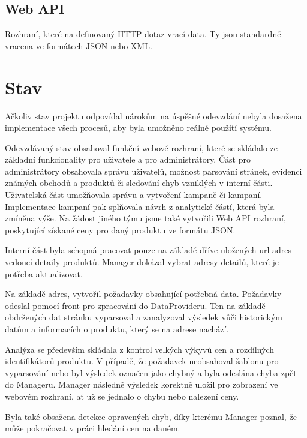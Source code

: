 \documentclass[thesis=B,czech]{FITthesis}[2012/06/26]
\begin{document}
\subsection{Web API}
Rozhraní, které na definovaný HTTP dotaz vrací data. Ty jsou standardně vracena ve formátech JSON nebo XML.

\section{Stav}
Ačkoliv stav projektu odpovídal nárokům na úspěšné odevzdání nebyla dosažena implementace všech procesů, aby byla umožněno reálné
použití systému.
\par
Odevzdávaný stav obsahoval funkční webové rozhraní, které se skládalo ze základní funkcionality pro uživatele a pro administrátory.
Část pro administrátory obsahovala správu uživatelů, možnost parsování stránek, evidenci známých obchodů a produktů či sledování
chyb vzniklých v interní části.
Uživatelská část umožňovala správu a vytvoření kampaně či kampaní. Implementace kampaní pak splňovala návrh z analytické částí,
která byla zmíněna výše.
Na žádost jiného týmu jsme také vytvořili Web API rozhraní, poskytující získané ceny pro daný produktu ve formátu JSON.
\par
Interní část byla schopná pracovat pouze na základě dříve uložených url adres vedoucí detaily produktů. 
Manager dokázal vybrat adresy detailů, které je potřeba aktualizovat.
\par
Na základě adres, vytvořil požadavky obsahující potřebná data. Požadavky odeslal pomocí front pro zpracování do DataProvideru. Ten na základě obdržených dat stránku vyparsoval a zanalyzoval výsledek vůči historickým datům a informacích o produktu, který se na adrese nachází.
\par
Analýza se především skládala z kontrol velkých výkyvů cen a rozdílných identifikátorů produktu.
V případě, že požadavek neobsahoval šablonu pro vyparsování nebo byl výsledek označen jako chybný a byla odeslána chyba
zpět do Manageru. Manager následně výsledek korektně uložil pro zobrazení ve webovém rozhraní, ať už se jednalo o chybu
nebo nalezení ceny.
\par
Byla také obsažena detekce opravených chyb, díky kterému Manager poznal, že může pokračovat v práci hledání cen na daném.
\end{document}
